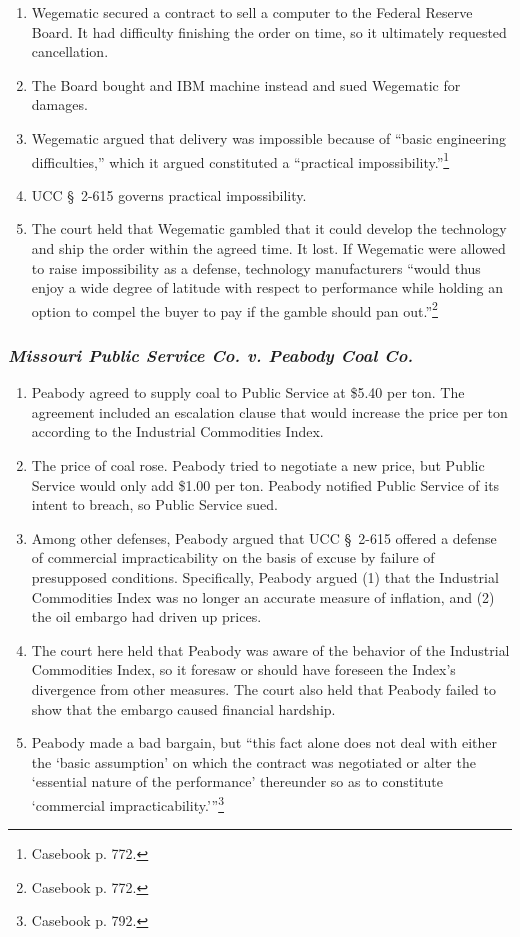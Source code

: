 \begin{enumerate}
    \item Wegematic secured a contract to sell a computer to the Federal 
    Reserve Board. It had difficulty finishing the order on time, so it 
    ultimately requested cancellation.
    \item The Board bought and IBM machine instead and sued Wegematic for 
    damages.
    \item Wegematic argued that delivery was impossible because of ``basic 
    engineering difficulties,'' which it argued constituted a ``practical 
    impossibility.''\footnote{Casebook p. 772.}
    \item UCC \S\ 2-615 governs practical impossibility.
    \item The court held that Wegematic gambled that it could develop the 
    technology and ship the order within the agreed time. It lost. If 
    Wegematic were allowed to raise impossibility as a defense, technology 
    manufacturers ``would thus enjoy a wide degree of latitude with respect to 
    performance while holding an option to compel the buyer to pay if the 
    gamble should pan out.''\footnote{Casebook p. 772.}
\end{enumerate}

\subsubsection{\emph{Missouri Public Service Co. v. Peabody Coal Co.}}

\begin{enumerate}
    \item Peabody agreed to supply coal to Public Service at \$5.40 per ton. 
    The agreement included an escalation clause that would increase the price 
    per ton according to the Industrial Commodities Index.
    \item The price of coal rose. Peabody tried to negotiate a new price, but 
    Public Service would only add \$1.00 per ton. Peabody notified Public 
    Service of its intent to breach, so Public Service sued.
    \item Among other defenses, Peabody argued that UCC \S\ 2-615 offered a 
    defense of commercial impracticability on the basis of excuse by failure 
    of presupposed conditions. Specifically, Peabody argued (1) that the 
    Industrial Commodities Index was no longer an accurate measure of 
    inflation, and (2) the oil embargo had driven up prices.
    \item The court here held that Peabody was aware of the behavior of the 
    Industrial Commodities Index, so it foresaw or should have foreseen the 
    Index's divergence from other measures. The court also held that Peabody 
    failed to show that the embargo caused financial hardship.
    \item Peabody made a bad bargain, but \enquote{this fact alone does not 
    deal with either the `basic assumption' on which the contract was 
    negotiated or alter the `essential nature of the performance' thereunder 
    so as to constitute `commercial impracticability.'}\footnote{Casebook p. 
    792.}
\end{enumerate}

